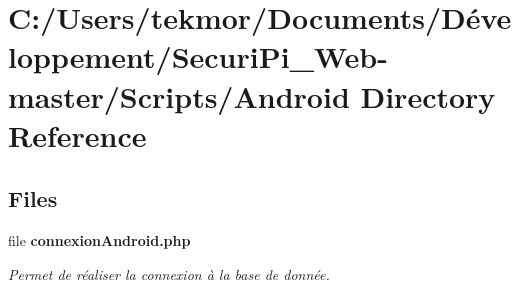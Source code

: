 \section{C\+:/\+Users/tekmor/\+Documents/\+Développement/\+Securi\+Pi\+\_\+\+Web-\/master/\+Scripts/\+Android Directory Reference}
\label{dir_c252332abc3254fef1a08c7ad27ba949}
\subsection*{Files}
\begin{DoxyCompactItemize}
\item 
file {\bf connexion\+Android.\+php}
\begin{DoxyCompactList}\small\item\em Permet de r\'{e}aliser la connexion \`{a} la base de donn\'{e}e. \end{DoxyCompactList}\end{DoxyCompactItemize}
